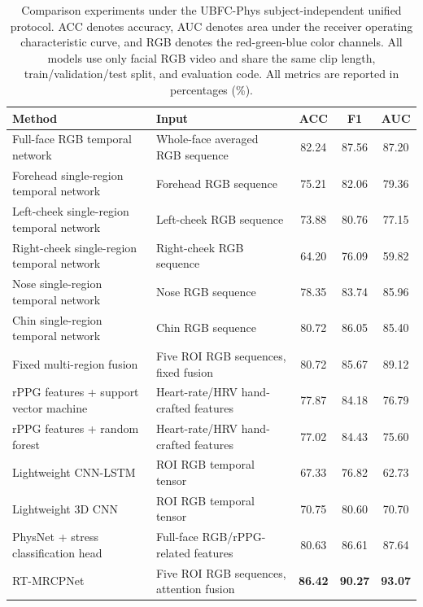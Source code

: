 \documentclass[runningheads]{llncs}
\begin{document}
\begin{table}[!htbp]
\caption{Comparison experiments under the UBFC-Phys subject-independent unified protocol. ACC denotes accuracy, AUC denotes area under the receiver operating characteristic curve, and RGB denotes the red-green-blue color channels. All models use only facial RGB video and share the same clip length, train/validation/test split, and evaluation code. All metrics are reported in percentages (\%).}
\label{tab:main_results}
\centering
\small
\begin{tabular}{p{3.9cm}p{4.45cm}ccc}
\toprule
Method & Input & ACC & F1 & AUC \\
\midrule
Full-face RGB temporal network & Whole-face averaged RGB sequence & 82.24 & 87.56 & 87.20 \\
\addlinespace[0.2em]
Forehead single-region temporal network & Forehead RGB sequence & 75.21 & 82.06 & 79.36 \\
Left-cheek single-region temporal network & Left-cheek RGB sequence & 73.88 & 80.76 & 77.15 \\
Right-cheek single-region temporal network & Right-cheek RGB sequence & 64.20 & 76.09 & 59.82 \\
Nose single-region temporal network & Nose RGB sequence & 78.35 & 83.74 & 85.96 \\
Chin single-region temporal network & Chin RGB sequence & 80.72 & 86.05 & 85.40 \\
\addlinespace[0.2em]
Fixed multi-region fusion & Five ROI RGB sequences, fixed fusion & 80.72 & 85.67 & 89.12 \\
\addlinespace[0.2em]
rPPG features + support vector machine & Heart-rate/HRV hand-crafted features & 77.87 & 84.18 & 76.79 \\
rPPG features + random forest & Heart-rate/HRV hand-crafted features & 77.02 & 84.43 & 75.60 \\
\addlinespace[0.2em]
Lightweight CNN-LSTM & ROI RGB temporal tensor & 67.33 & 76.82 & 62.73 \\
Lightweight 3D CNN & ROI RGB temporal tensor & 70.75 & 80.60 & 70.70 \\
\addlinespace[0.2em]
PhysNet + stress classification head & Full-face RGB/rPPG-related features & 80.63 & 86.61 & 87.64 \\
\addlinespace[0.2em]
RT-MRCPNet & Five ROI RGB sequences, attention fusion & \textbf{86.42} & \textbf{90.27} & \textbf{93.07} \\
\bottomrule
\end{tabular}
\end{table}
\end{document}
